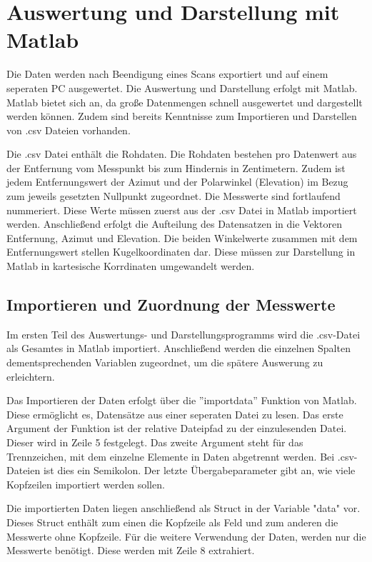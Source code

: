 

\chapter{Auswertung und Darstellung mit Matlab}\label{chap:auswertung_matlab}

Die Daten werden nach Beendigung eines Scans exportiert und auf einem seperaten PC ausgewertet. Die Auswertung und Darstellung erfolgt mit Matlab. Matlab bietet sich an, da große Datenmengen schnell ausgewertet und dargestellt werden können. Zudem sind bereits Kenntnisse zum Importieren und Darstellen von .csv Dateien vorhanden. 

Die .csv Datei enthält die Rohdaten. Die Rohdaten bestehen pro Datenwert aus der Entfernung vom Messpunkt bis zum Hindernis in Zentimetern. Zudem ist jedem Entfernungswert der Azimut und der Polarwinkel (Elevation) im Bezug zum jeweils gesetzten Nullpunkt zugeordnet. Die Messwerte sind fortlaufend nummeriert. 
Diese Werte müssen zuerst aus der .csv Datei in Matlab importiert werden. Anschließend erfolgt die Aufteilung des Datensatzen in die Vektoren Entfernung, Azimut und Elevation.
Die beiden Winkelwerte zusammen mit dem Entfernungswert stellen Kugelkoordinaten dar. Diese müssen zur Darstellung in Matlab in kartesische Korrdinaten umgewandelt werden. 



\section{Importieren und Zuordnung der Messwerte}

Im ersten Teil des Auswertungs- und Darstellungsprogramms wird die .csv-Datei als Gesamtes in Matlab importiert. Anschließend werden die einzelnen Spalten dementsprechenden Variablen zugeordnet, um die spätere Auswerung zu erleichtern.

Das Importieren der Daten erfolgt über die ''importdata'' Funktion von Matlab. Diese ermöglicht es, Datensätze aus einer seperaten Datei zu lesen. Das erste Argument der Funktion ist der relative Dateipfad zu der einzulesenden Datei. Dieser wird in Zeile 5 festgelegt. Das zweite Argument steht für das Trennzeichen, mit dem einzelne Elemente in Daten abgetrennt werden. Bei .csv-Dateien ist dies ein Semikolon. Der letzte Übergabeparameter gibt an, wie viele Kopfzeilen importiert werden sollen.

Die importierten Daten liegen anschließend als Struct in der Variable "data" vor. Dieses Struct enthält zum einen die Kopfzeile als Feld und zum anderen die Messwerte ohne Kopfzeile. Für die weitere Verwendung der Daten, werden nur die Messwerte benötigt. Diese werden mit Zeile 8 extrahiert. 

